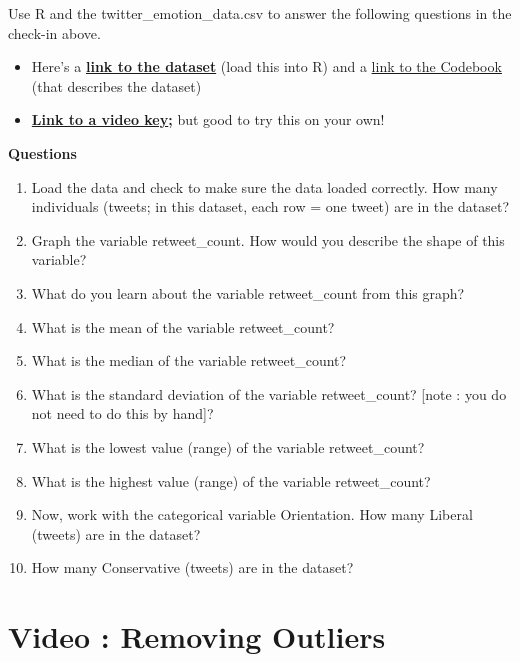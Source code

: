 \documentclass[
  letterpaper,
  DIV=11,
  numbers=noendperiod,
  oneside]{scrreprt}
\begin{document}
Use R and the twitter\_emotion\_data.csv to answer the following
questions in the check-in above.

\begin{itemize}
\item
  Here's a
  \href{https://www.dropbox.com/scl/fi/zye2fojtmol8wdmd1gfb7/twitter_emotion_data.csv?rlkey=t728np5edvmw3wjoorj2hddwu&dl=0}{\textbf{link
  to the dataset}} (load this into R) and a
  \href{https://www.dropbox.com/scl/fi/0q0meai7hawk4oexw948c/CODEBOOK-_-Twitter-Emotion-Dataset.pdf?rlkey=yz6aiqtow6k4ey16k8qd0y4yz&dl=0}{link
  to the Codebook} (that describes the dataset)
\item
  \href{https://youtu.be/L3kQXfp2jNg}{\textbf{Link to a video
  key}}\textbf{;} but good to try this on your own!
\end{itemize}

\textbf{Questions}

\begin{enumerate}
\def\labelenumi{\arabic{enumi}.}
\item
  Load the data and check to make sure the data loaded correctly. How
  many individuals (tweets; in this dataset, each row = one tweet) are
  in the dataset?
\item
  Graph the variable retweet\_count. How would you describe the shape of
  this variable?
\item
  What do you learn about the variable retweet\_count from this graph?
\item
  What is the mean of the variable retweet\_count?
\item
  What is the median of the variable retweet\_count?
\item
  What is the standard deviation of the variable retweet\_count? {[}note
  : you do not need to do this by hand{]}?
\item
  What is the lowest value (range) of the variable retweet\_count?
\item
  What is the highest value (range) of the variable retweet\_count?
\item
  Now, work with the categorical variable Orientation. How many Liberal
  (tweets) are in the dataset?
\item
  How many Conservative (tweets) are in the dataset?
\end{enumerate}

\section{Video : Removing Outliers}\label{video-removing-outliers}
\end{document}

